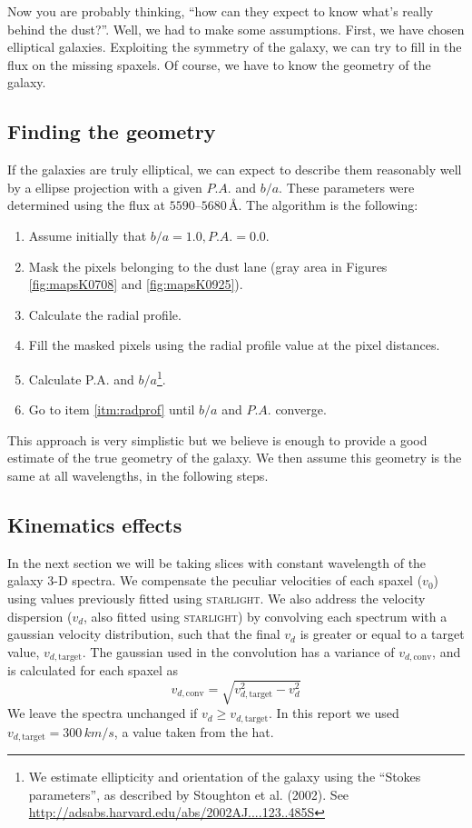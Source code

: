\documentclass[a4paper]{article}
\newcommand{\angstrom}{\text{\AA}}
\def\starlight{\textsc{starlight}\xspace}
\begin{document}
Now you are probably thinking, ``how can they expect to know what's
really behind the dust?''. Well, we had to make some
assumptions. First, we have chosen elliptical galaxies. Exploiting the
symmetry of the galaxy, we can try to fill in the flux on the missing
spaxels. Of course, we have to know the geometry of the galaxy.

\subsection{Finding the geometry}
\label{sec:geometry}

If the galaxies are truly elliptical, we can expect to describe them reasonably
well by a ellipse projection with a given $P.A.$ and $b/a$. These parameters
were determined using the flux at $5590$--$5680\,\angstrom$. The algorithm is
the following:

\begin{enumerate}
  \item Assume initially that $b/a = 1.0, P.A. = 0.0$.
  \item Mask the pixels belonging to the dust lane (gray area in Figures
  \ref{fig:mapsK0708} and \ref{fig:mapsK0925}).
  \item \label{itm:radprof} Calculate the radial profile.
  \item Fill the masked pixels using the radial profile value at the pixel distances.
  \item Calculate P.A. and $b/a$\footnote{We estimate ellipticity and
  orientation of the galaxy using the ``Stokes parameters'', as described by
  Stoughton et al. (2002). See \url{http://adsabs.harvard.edu/abs/2002AJ....123..485S}}.
  \item Go to item \ref{itm:radprof} until $b/a$ and $P.A.$ converge.
\end{enumerate}

This approach is very simplistic but we believe is enough to provide a good
estimate of the true geometry of the galaxy. We then assume this geometry is the
same at all wavelengths, in the following steps.

\subsection{Kinematics effects}

In the next section we will be taking slices with constant wavelength of the
galaxy 3-D spectra. We compensate the peculiar velocities of each spaxel ($v_0$)
using values previously fitted using \starlight. We also address the velocity
dispersion ($v_d$, also fitted using \starlight) by convolving each spectrum
with a gaussian velocity distribution, such that the final $v_d$ is greater or
equal to a target value, $v_{d,\text{target}}$. The gaussian used in the
convolution has a variance of $v_{d,\text{conv}}$, and is calculated for each
spaxel as \[ v_{d,\text{conv}} = \sqrt{v^2_{d,\text{target}} - v^2_d} \] We
leave the spectra unchanged if $v_d \geq v_{d,\text{target}}$. In this report we
used $v_{d,\text{target}} = 300\,km/s$, a value taken from the hat.
\end{document}
